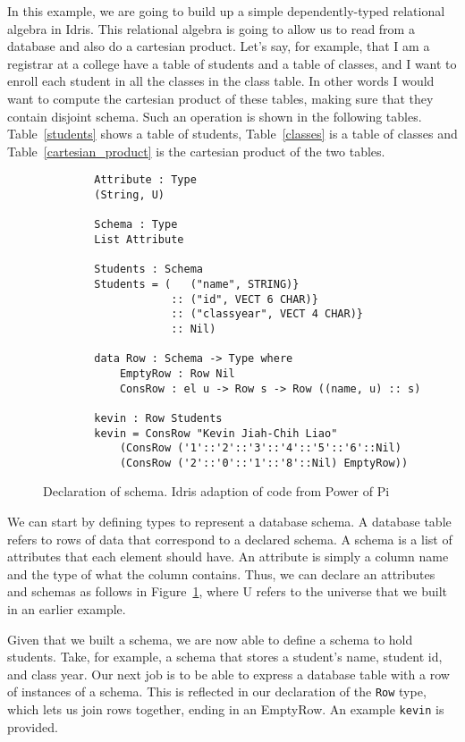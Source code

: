 In this example, we are going to build up a simple dependently-typed relational
algebra in Idris. This relational algebra is going to allow us to read from a
database and also do a cartesian product. Let's say, for example, that I am a
registrar at a college have a table of students and a table of classes, and I
want to enroll each student in all the classes in the class table. In other
words I would want to compute the cartesian product of these tables, making sure
that they contain disjoint schema. Such an operation is shown in the following
tables. Table~\ref{students} shows a table of students, Table~\ref{classes} is a
table of classes and Table~\ref{cartesian_product} is the cartesian product of
the two tables.

\begin{figure}[h]
    \caption{Declaration of schema. Idris adaption of code from Power of Pi \protect\cite{power_of_pi}}
    \label{schema}
    \begin{lstlisting}
        Attribute : Type
        (String, U)

        Schema : Type
        List Attribute

        Students : Schema
        Students = (   ("name", STRING)}
                    :: ("id", VECT 6 CHAR)} 
                    :: ("classyear", VECT 4 CHAR)}
                    :: Nil)

        data Row : Schema -> Type where
            EmptyRow : Row Nil
            ConsRow : el u -> Row s -> Row ((name, u) :: s)

        kevin : Row Students
        kevin = ConsRow "Kevin Jiah-Chih Liao"
            (ConsRow ('1'::'2'::'3'::'4'::'5'::'6'::Nil)
            (ConsRow ('2'::'0'::'1'::'8'::Nil) EmptyRow))
    \end{lstlisting}
\end{figure}

We can start by defining types to represent a database schema. A database table
refers to rows of data that correspond to a declared schema. A schema is a list
of attributes that each element should have. An attribute is simply a column
name and the type of what the column contains. Thus, we can declare an
attributes and schemas as follows in Figure~\ref{schema}, where U refers to the
universe that we built in an earlier example. 

Given that we built a schema, we are now able to define a schema to hold
students. Take, for example, a schema that stores a student's name, student id,
and class year. Our next job is to be able to express a database table with a
row of instances of a schema. This is reflected in our declaration of the
\texttt{Row} type, which lets us join rows together, ending in an EmptyRow. An
example \texttt{kevin} is provided. 

